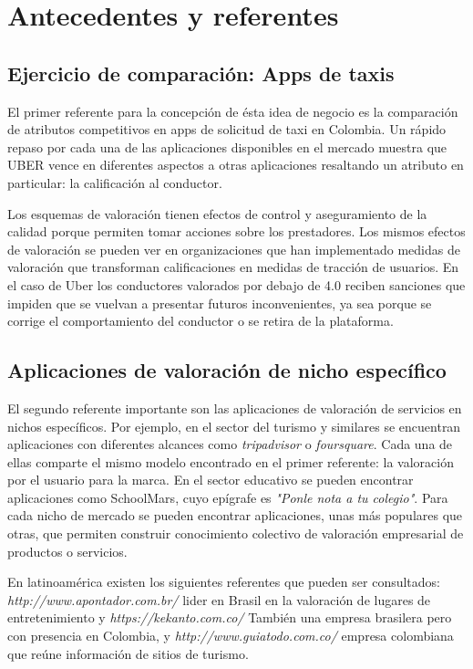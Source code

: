 \section{Antecedentes y referentes}

\subsection{Ejercicio de comparación: Apps de taxis}

El primer referente para la concepción de ésta idea de negocio es la comparación de atributos competitivos en apps de solicitud de taxi en Colombia. Un rápido repaso por cada una de las aplicaciones disponibles en el mercado muestra que UBER \cite{avalos2015baby} vence en diferentes aspectos a otras aplicaciones resaltando un atributo en particular: la calificación al conductor. 

Los esquemas de valoración tienen efectos de control y aseguramiento de la calidad porque permiten tomar acciones sobre los prestadores. Los mismos efectos de valoración se pueden ver en organizaciones que han implementado medidas de valoración que transforman calificaciones en medidas de tracción de usuarios. En el caso de Uber los conductores valorados por debajo de 4.0 reciben sanciones que impiden que se vuelvan a presentar futuros inconvenientes, ya sea porque se corrige el comportamiento del conductor o se retira de la plataforma.

\subsection{Aplicaciones de valoración de nicho específico}

El segundo referente importante son las aplicaciones de valoración de servicios en nichos específicos. Por ejemplo, en el sector del turismo y similares se encuentran aplicaciones con diferentes alcances como \textit{tripadvisor} o \textit{foursquare}. Cada una de ellas comparte el mismo modelo encontrado en el primer referente: la valoración por el usuario para la marca. En el sector educativo se pueden encontrar aplicaciones como SchoolMars, cuyo epígrafe es \textit{"Ponle nota a tu colegio"}\cite{schollmars:2013:Online}. 
Para cada nicho de mercado se pueden encontrar aplicaciones, unas más populares que otras, que permiten construir conocimiento colectivo de valoración empresarial de productos o servicios.

En latinoamérica existen los siguientes referentes que pueden ser consultados: \textit{http://www.apontador.com.br/} lider en Brasil en la valoración de lugares de entretenimiento y \textit{https://kekanto.com.co/} También una empresa brasilera pero con presencia en Colombia, y \textit{http://www.guiatodo.com.co/} empresa colombiana que reúne información de sitios de turismo.

